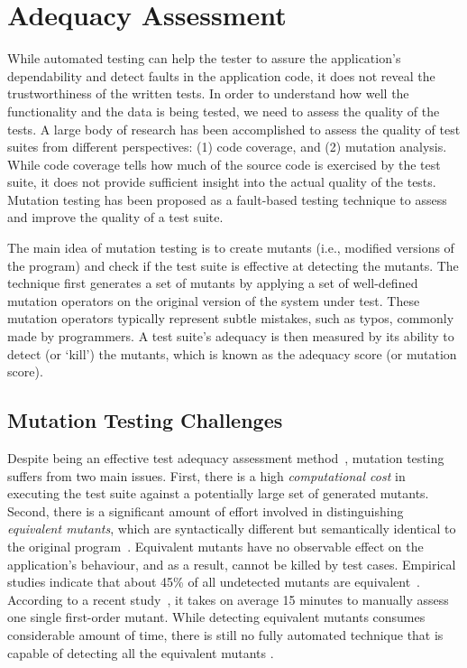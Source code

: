 \section{Adequacy Assessment} \label{Sec:adequacy}
While automated testing can help the tester to assure the application's dependability and detect faults in the application code, it does not reveal the trustworthiness of the written tests.
In order to understand how well the functionality and the data is being tested, we need to assess the quality of the tests.
A large body of research has been accomplished to assess the quality of test suites
from different perspectives: (1) code coverage, and (2) mutation analysis.
While code coverage tells how much of the source code is exercised by the test suite, it does not provide sufficient insight into the actual quality of the tests. Mutation testing has been proposed as a fault-based testing technique to assess and improve the quality of a test suite.

The main idea of mutation testing is to create mutants (i.e., modified versions of the program) and check if the test suite is effective at detecting the mutants. 
The technique first generates a set of mutants by applying a set of well-defined mutation operators on the original version of the system under test. 
These mutation operators typically represent subtle mistakes, such as typos, commonly made by programmers. A test suite's adequacy is then measured by its ability to detect (or `kill') the mutants, which is known as the adequacy score (or mutation score).

\subsection{Mutation Testing Challenges}
Despite being an effective test adequacy assessment method~\cite{andrews:icse05,jia:tse10}, mutation testing suffers from two main issues.  First, there is a high \emph{computational cost} in executing the test suite against a potentially large set of generated mutants. Second, there is a significant amount of effort  involved in distinguishing \emph{equivalent mutants}, which are syntactically different but semantically identical to the original program~\cite{budd:acta82}.  Equivalent mutants have no observable effect on the application's behaviour, and as a result, cannot be killed by test cases. Empirical studies indicate that about 45\% of all undetected mutants are equivalent~\cite{schuler:tvr12, madeyski:tse13}.
According to a recent study~\cite{madeyski:tse13}, it takes on average 15 minutes to manually assess one single first-order mutant. While detecting equivalent mutants consumes considerable amount of time, there is still no fully automated technique that is capable of detecting all the equivalent mutants \cite{madeyski:tse13}.

